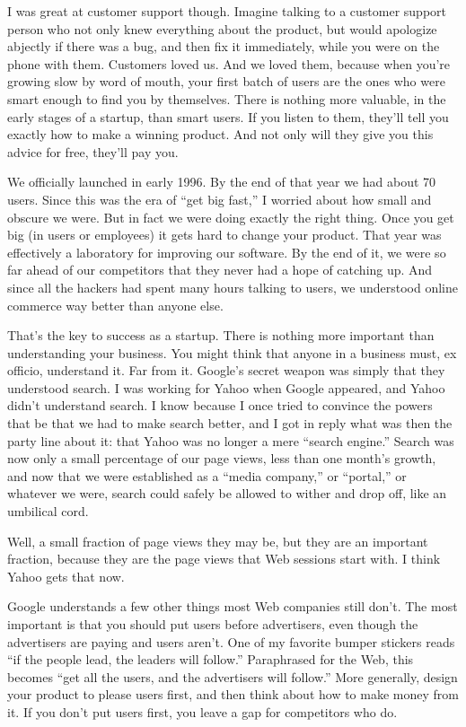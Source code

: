 \documentclass[12pt]{book}
\begin{document}
I was great at customer support though. Imagine talking to a customer
support person who not only knew everything about the product, but would
apologize abjectly if there was a bug, and then fix it immediately,
while you were on the phone with them. Customers loved us. And we loved
them, because when you're growing slow by word of mouth, your first
batch of users are the ones who were smart enough to find you by
themselves. There is nothing more valuable, in the early stages of a
startup, than smart users. If you listen to them, they'll tell you
exactly how to make a winning product. And not only will they give you
this advice for free, they'll pay you.

We officially launched in early 1996. By the end of that year we had
about 70 users. Since this was the era of ``get big fast,'' I worried
about how small and obscure we were. But in fact we were doing exactly
the right thing. Once you get big (in users or employees) it gets hard
to change your product. That year was effectively a laboratory for
improving our software. By the end of it, we were so far ahead of our
competitors that they never had a hope of catching up. And since all the
hackers had spent many hours talking to users, we understood online
commerce way better than anyone else.

That's the key to success as a startup. There is nothing more important
than understanding your business. You might think that anyone in a
business must, ex officio, understand it. Far from it. Google's secret
weapon was simply that they understood search. I was working for Yahoo
when Google appeared, and Yahoo didn't understand search. I know because
I once tried to convince the powers that be that we had to make search
better, and I got in reply what was then the party line about it: that
Yahoo was no longer a mere ``search engine.'' Search was now only a
small percentage of our page views, less than one month's growth, and
now that we were established as a ``media company,'' or ``portal,'' or
whatever we were, search could safely be allowed to wither and drop off,
like an umbilical cord.

Well, a small fraction of page views they may be, but they are an
important fraction, because they are the page views that Web sessions
start with. I think Yahoo gets that now.

Google understands a few other things most Web companies still don't.
The most important is that you should put users before advertisers, even
though the advertisers are paying and users aren't. One of my favorite
bumper stickers reads ``if the people lead, the leaders will follow.''
Paraphrased for the Web, this becomes ``get all the users, and the
advertisers will follow.'' More generally, design your product to please
users first, and then think about how to make money from it. If you
don't put users first, you leave a gap for competitors who do.
\end{document}
